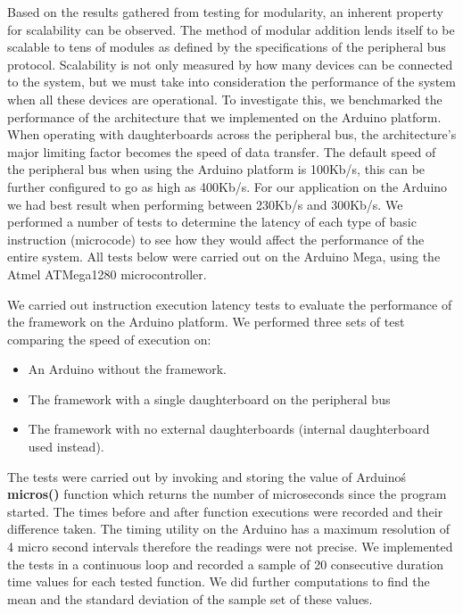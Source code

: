 Based on the results gathered from testing for modularity, an inherent property for scalability can be observed. The method of modular addition lends itself to be scalable to tens of modules as defined by the specifications of the \iic peripheral bus protocol. Scalability is not only measured by how many devices can be connected to the system, but we must take into consideration the performance of the system when all these devices are operational. To investigate this, we benchmarked the performance of the architecture that we implemented on the Arduino platform.  When operating with daughterboards across the peripheral bus, the \xten architecture's major limiting factor becomes the speed of data transfer. The default speed of the \iic peripheral bus when using the Arduino platform is 100Kb/s, this can be further configured to go as high as 400Kb/s. For our application on the Arduino we had best result when performing between 230Kb/s and 300Kb/s. We performed a number of tests to determine the latency of each type of basic instruction (microcode) to see how they would affect the performance of the entire system. All tests below were carried out on the Arduino Mega, using the Atmel \texttrademark ATMega1280 microcontroller.

We carried out instruction execution latency tests to evaluate the performance of the \xten framework on the Arduino platform. We performed three sets of test comparing the speed of execution on:
\begin{itemize}
\item  An Arduino without the \xten framework.
\item The \xten framework with a single daughterboard on the peripheral bus
\item The \xten framework with no external daughterboards (internal daughterboard used instead).
\end{itemize}

The tests were carried out by invoking and storing the value of Arduino\'s \textbf{micros()} function which returns the number of microseconds since the program started. The times before and after function executions were recorded and their difference taken. The timing utility on the Arduino has a maximum resolution of 4 micro second intervals therefore the readings were not precise. We implemented the tests in a continuous loop and recorded a sample of 20 consecutive duration time values for each tested function. We did further computations to find the mean and the standard deviation of the sample set of these values.

